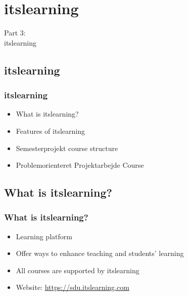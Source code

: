 \documentclass[t, aspectratio=169]{beamer}
\begin{document}
\section{itslearning}
\begin{frame}
  \vspace{25mm}
  \begin{center}
    \Huge{Part 3:\\itslearning}
  \end{center}
\end{frame}

\subsection{itslearning}
\begin{frame}[fragile]
  \frametitle{itslearning}
  
  \vspace{7mm}
  \begin{itemize}
    \setlength\itemsep{7mm}
    \item What is itslearning?
    \item Features of itslearning
    \item Semesterprojekt course structure
    \item Problemorienteret Projektarbejde Course
  \end{itemize}
\end{frame}

\subsection{What is itslearning?}
\begin{frame}[fragile]
  \frametitle{What is itslearning?}
  
  \vspace{7mm}
  \begin{itemize}
    \setlength\itemsep{7mm}
    \item Learning platform
    \item Offer ways to enhance teaching and students’ learning
    \item All courses are supported by itslearning
    \item Website: \textcolor{blue}{\url{https://sdu.itslearning.com}}
  \end{itemize}
\end{frame}
\end{document}

